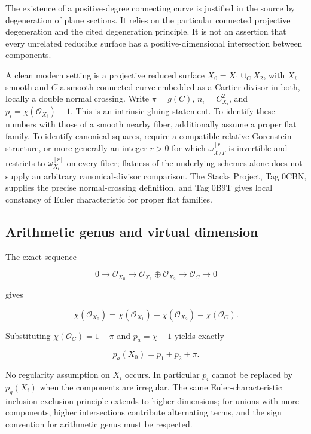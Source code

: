 The existence of a positive-degree connecting curve is justified in the source by degeneration of plane sections. It relies on the particular connected projective degeneration and the cited degeneration principle. It is not an assertion that every unrelated reducible surface has a positive-dimensional intersection between components.

A clean modern setting is a projective reduced surface \(X_0=X_1\cup_CX_2\), with \(X_i\) smooth and \(C\) a smooth connected curve embedded as a Cartier divisor in both, locally a double normal crossing. Write \(\pi=g(C)\), \(n_i=C^2_{X_i}\), and \(p_i=\chi(\mathcal O_{X_i})-1\). This is an intrinsic gluing statement. To identify these numbers with those of a smooth nearby fiber, additionally assume a proper flat family. To identify canonical squares, require a compatible relative Gorenstein structure, or more generally an integer \(r>0\) for which \(\omega_{\mathcal X/T}^{[r]}\) is invertible and restricts to \(\omega_{X_t}^{[r]}\) on every fiber; flatness of the underlying schemes alone does not supply an arbitrary canonical-divisor comparison. The Stacks Project, Tag 0CBN, supplies the precise normal-crossing definition, and Tag 0B9T gives local constancy of Euler characteristic for proper flat families.

\subsection{Arithmetic genus and virtual dimension}

The exact sequence

\[
0\to\mathcal O_{X_0}\to
\mathcal O_{X_1}\oplus\mathcal O_{X_2}
\to\mathcal O_C\to0
\tag{IV.21.1}
\]

gives

\[
\chi(\mathcal O_{X_0})=\chi(\mathcal O_{X_1})+
\chi(\mathcal O_{X_2})-\chi(\mathcal O_C).
\]

Substituting \(\chi(\mathcal O_C)=1-\pi\) and \(p_a=\chi-1\) yields exactly

\[
\boxed{p_a(X_0)=p_1+p_2+\pi.}
\tag{IV.21.2}
\]

No regularity assumption on \(X_i\) occurs. In particular \(p_i\) cannot be replaced by \(p_g(X_i)\) when the components are irregular. The same Euler-characteristic inclusion-exclusion principle extends to higher dimensions; for unions with more components, higher intersections contribute alternating terms, and the sign convention for arithmetic genus must be respected.

